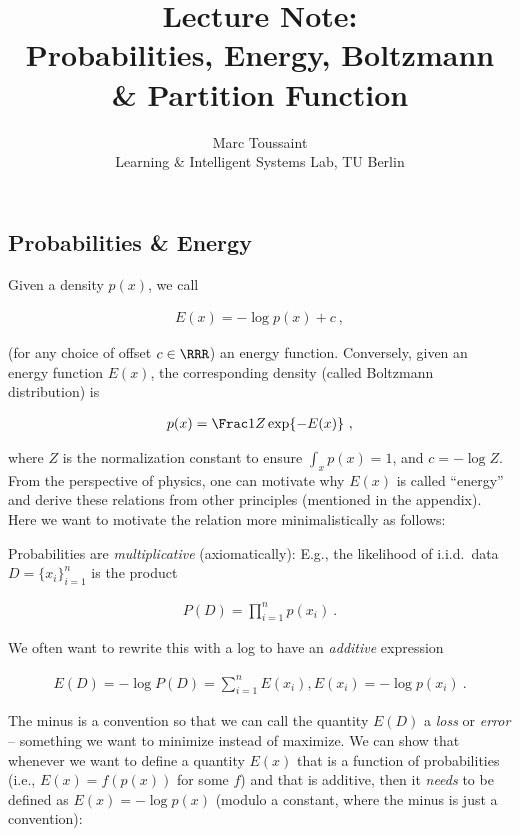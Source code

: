 %
\note

\title{Lecture Note:\\ Probabilities, Energy, Boltzmann \& Partition Function}
\author{Marc Toussaint\\\small Learning \& Intelligent Systems Lab, TU Berlin}

\notetitle



\subsection{Probabilities \& Energy}

Given a density $p(x)$, we call

\begin{align}
E(x) = -\log p(x) + c ~,
\end{align}

(for any choice of offset $c\in\RRR$) an energy function. Conversely, given an energy function $E(x)$, the corresponding density (called Boltzmann distribution) is

\begin{align}
p(x) = \Frac 1Z \exp\lbrace-E(x)\rbrace ~,
\end{align}

where $Z$ is the normalization constant to ensure $\int_x p(x) = 1$,
and $c=-\log Z$. From the perspective of physics, one can motivate why
$E(x)$ is called ``energy'' and derive these relations from other
principles (mentioned in the appendix). Here we want to motivate the
relation more minimalistically as follows:

Probabilities are \emph{multiplicative} (axiomatically): E.g., the likelihood of i.i.d.\ data $D = \lbrace x_i \rbrace_{i=1}^n$ is the product

\begin{align}
P(D) = \prod_{i=1}^n p(x_i) ~.
\end{align}

We often want to rewrite this with a log to have an \emph{additive} expression

\begin{align}
E(D) = -\log P(D) = \sum_{i=1}^n E(x_i) \comma E(x_i) = -\log p(x_i) ~.
\end{align}

The minus is a convention so that we can call the quantity $E(D)$
a \emph{loss} or \emph{error} -- something we want to minimize instead
of maximize. We can show that whenever we want to define a
quantity $E(x)$ that is a function of probabilities (i.e., $E(x) =
f(p(x))$ for some $f$) and that is additive, then it \emph{needs} to
be defined as $E(x) = -\log p(x)$ (modulo a constant, where the minus
is just a convention):

